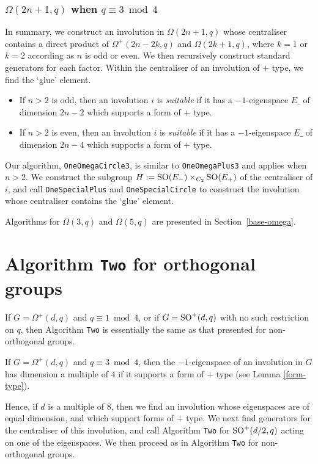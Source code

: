 \documentclass[12pt]{article}
\def\SO{{\rm SO}}
\begin{document}
\subsubsection{$\Omega(2n+1,q)$ when $q\equiv3\bmod4$}
In summary, we construct an involution in $\Omega(2n+1,q)$ 
whose centraliser
contains a direct product of $\Omega^+(2n-2k,q)$ and $\Omega(2k + 1,q)$,
where $k = 1$ or $k=2$ according as $n$ is odd or even.
We then recursively construct standard generators for each factor. 
Within the centraliser of an involution of $+$ type,
we find the `glue' element. 

\begin{itemize}
\item 
If $n>2$ is odd, then 
an involution $i$ is {\it suitable} if it has 
a $-1$-eigenspace $E\_$ of dimension $2n - 2$ which
supports a form of $+$ type.

\item 
If $n>2$ is even, 
then an involution $i$ is {\it suitable} if it has 
a $-1$-eigenspace $E\_$ of dimension $2n - 4$ which
supports a form of $+$ type.
\end{itemize}
Our algorithm, {\tt OneOmegaCircle3}, is similar to {\tt OneOmegaPlus3}
and applies when $n > 2$.
We construct the subgroup 
$H := \SO(E_-) \times_{C_2} \SO(E_+)$ of the centraliser 
of $i$, and call 
{\tt OneSpecialPlus} and {\tt OneSpecialCircle} to construct
the involution whose centraliser contains 
the `glue' element. 

Algorithms for $\Omega (3, q)$ and $\Omega(5, q)$ 
are presented in Section~\ref{base-omega}.

\section{Algorithm {\tt Two} for orthogonal groups}
\label{Alg4}

If $G=\Omega^+(d, q)$ and $q\equiv1\bmod4$, or if $G=\SO^+(d,q)$ with
no such restriction on $q$, then Algorithm {\tt Two} is essentially the 
same as that presented for non-orthogonal groups.

If $G=\Omega^+(d,q)$ and $q\equiv3\bmod4$, then the $-1$-eigenspace of 
an involution in $G$ has dimension a multiple of 4 if
it supports a form of $+$ type (see Lemma \ref{form-type}).  

Hence, if $d$ is a multiple of 8, then we 
find an involution whose eigenspaces are of equal dimension,
and which support forms of $+$ type.  We next find generators for
the centraliser of this involution, and call Algorithm {\tt Two} for
$\SO^+(d/2,q)$ acting on one of the eigenspaces.  We then proceed
as in Algorithm {\tt Two} for non-orthogonal groups.
\end{document}

